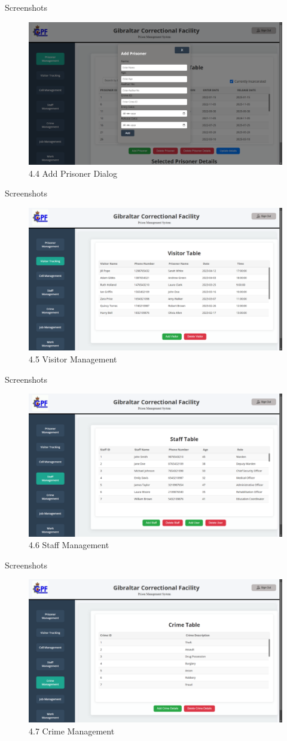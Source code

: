 \documentclass[aspectratio=169]{beamer}
\begin{document}
\begin{frame}{Screenshots}
    \begin{figure}
        \centering
        \includegraphics[width=0.6\linewidth]{addprisoner.png}
        \caption{4.4 Add Prisoner Dialog}
        \label{fig:addp}
    \end{figure}
\end{frame}
\begin{frame}{Screenshots}
    \begin{figure}
        \centering
        \includegraphics[width=0.6\linewidth]{visitor.png}
        \caption{4.5 Visitor Management}
        \label{fig:visitor}
    \end{figure}
\end{frame}
\begin{frame}{Screenshots}
    \begin{figure}
        \centering
        \includegraphics[width=0.6\linewidth]{staff.png}
        \caption{4.6 Staff Management}
        \label{fig:staff}
    \end{figure}
\end{frame}
\begin{frame}{Screenshots}
    \begin{figure}
        \centering
        \includegraphics[width=0.6\linewidth]{crime.png}
        \caption{4.7 Crime Management}
        \label{fig:crime}
    \end{figure}
\end{frame}
\end{document}
